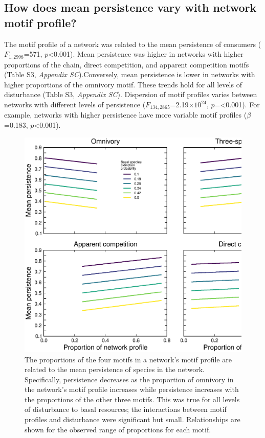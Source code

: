 \documentclass[12pt]{article}
\begin{document}
\begin{spacing}{2.0}
    \clearpage

    \subsection*{How does mean persistence vary with network motif profile?}
    
        The motif profile of a network was related to the mean persistence of consumers ($F_{1,2998}$=571, $p$\textless0.001). Mean persistence was higher in networks with higher proportions of the chain, direct competition, and apparent competition motifs (Table S3, \emph{Appendix SC}).Conversely, mean persistence is lower in networks with higher proportions of the omnivory motif. These trends hold for all levels of disturbance (Table S3, \emph{Appendix SC}). Dispersion of motif profiles varies between networks with different levels of persistence ($F_{134,2865}$=2.19$\times10^{24}$, $p$=\textless0.001). For example, networks with higher persistence have more variable motif profiles ($\beta$=0.183, $p$\textless0.001).


        \begin{figure}
            \centering
            \includegraphics[height=.5\textheight]{figures/persistence_motif_profiles.eps}
            \caption{The proportions of the four motifs in a network's motif profile are related to the mean persistence of species in the network. Specifically, persistence decreases as the proportion of omnivory in the network's motif profile increases while persistence increases with the proportions of the other three motifs. This was true for all levels of disturbance to basal resources; the interactions between motif profiles and disturbance were significant but small. Relationships are shown for the observed range of proportions for each motif.}      
            \label{fig:motif_profile_persistence}
        \end{figure}    


\end{spacing}
\end{document}
